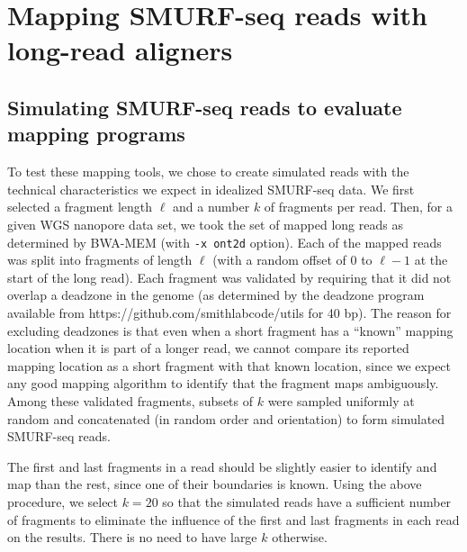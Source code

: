 \chapter{Mapping SMURF-seq reads with long-read aligners}
\label{appendB}
\section*{Simulating SMURF-seq reads to evaluate mapping programs}
To test these mapping tools, we chose to create simulated reads with the
technical characteristics we expect in idealized SMURF-seq data. We
first selected a fragment length $\ell$ and a number $k$ of fragments
per read. Then, for a given WGS nanopore data set, we took the set of
mapped long reads as determined by BWA-MEM (with \texttt{-x ont2d}
option).
Each of the mapped reads was split into fragments of length $\ell$ (with
a random offset of $0$ to $\ell-1$ at the start of the long read). Each
fragment was validated by requiring that it did not overlap a deadzone
in the genome (as determined by the deadzone program available from
https://github.com/smithlabcode/utils for 40 bp). The reason for
excluding deadzones is that even when a short fragment has a ``known''
mapping location when it is part of a longer read, we cannot compare its
reported mapping location as a short fragment with that known location,
since we expect any good mapping algorithm to identify that the fragment
maps ambiguously. Among these validated fragments, subsets of $k$ were
sampled uniformly at random and concatenated (in random order and
orientation) to form simulated SMURF-seq reads.

The first and last fragments in a read should be slightly easier to
identify and map than the rest, since one of their boundaries is
known. Using the above procedure, we select $k=20$ so that the
simulated reads have a sufficient number of fragments to eliminate the
influence of the first and last fragments in each read on the
results. There is no need to have large $k$ otherwise.

